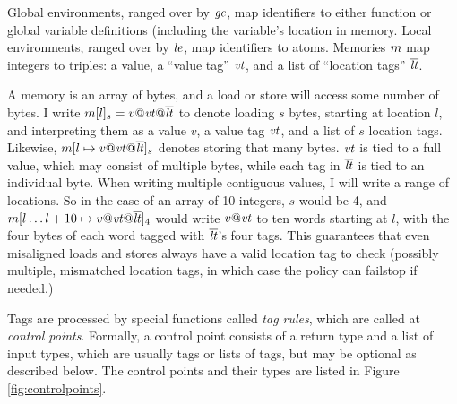 \documentclass[acmsmall,review,anonymous]{acmart}\settopmatter{printfolios=true,printccs=false,printacmref=false}
\begin{document}
Global environments, ranged over by \(\mathit{ge}\), map identifiers to either function
or global variable definitions (including the variable's location in memory. Local environments,
ranged over by \(\mathit{le}\), map identifiers to atoms.
Memories \(m\) map integers to
triples: a value, a ``value tag'' \(\mathit{vt}\), and a list of ``location tags'' \(\overline{\mathit{lt}}\).

A memory is an array of bytes, and a load or store will access some number of bytes. I write
\(m[l]_s = v@\mathit{vt} @\overline{\mathit{lt}}\) to denote loading \(s\) bytes,
starting at location \(l\), and interpreting them as a value \(v\), a value tag \(\mathit{vt}\), and a list of
\(s\) location tags. Likewise, \(m[l \mapsto v@\mathit{vt} @ \overline{\mathit{lt}}]_s\)
denotes storing that many bytes. \(\mathit{vt}\) is tied to a full value, which may consist of
multiple bytes, while each tag in \(\overline{\mathit{lt}}\) is tied to an individual byte.
When writing multiple contiguous values, I will write a range of locations. So
in the case of an array of 10 integers, \(s\) would be 4, and
\(m[l \dots l+10 \mapsto v@\mathit{vt} @ \overline{\mathit{lt}}]_4\) would write \(v@\mathit{vt}\) to ten words starting at \(l\),
with the four bytes of each word tagged with \(\overline{\mathit{lt}}\)'s four tags.
This guarantees that even misaligned loads and stores always have a valid location tag to check
(possibly multiple, mismatched location tags, in which case the policy can failstop if needed.)

Tags are processed by special functions called {\it tag rules}, which are called at
{\it control points}. Formally, a control point consists of a return type and a list
of input types, which are usually tags or lists of tags, but may be optional as described
below. The control points and their types are listed in Figure \ref{fig:controlpoints}.
\end{document}
